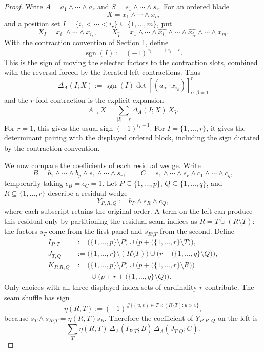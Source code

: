 \documentclass[11pt]{article}
\begin{document}
\begin{proof}
Write \(A=a_1\wedge\cdots\wedge a_r\) and
\(S=s_1\wedge\cdots\wedge s_r\). For an ordered blade
\[
X=x_1\wedge\cdots\wedge x_m
\]
and a position set \(I=\{i_1<\cdots<i_r\}\subseteq\{1,\ldots,m\}\), put
\[
X_I=x_{i_1}\wedge\cdots\wedge x_{i_r},\qquad
X_{\widehat I}=x_1\wedge\cdots\wedge\widehat{x_{i_1}}\wedge\cdots
\wedge\widehat{x_{i_r}}\wedge\cdots\wedge x_m.
\]
With the contraction convention of Section 1, define
\[
\operatorname{sgn}(I):=(-1)^{\,i_1+\cdots+i_r-r}.
\]
This is the sign of moving the selected factors to the contraction slots,
combined with the reversal forced by the iterated left contractions. Thus
\[
\Delta_A(I;X)
:=\operatorname{sgn}(I)
\det\!\left[(a_\alpha\cdot x_{i_\beta})\right]_
             {\alpha,\beta=1}^{r}
\]
and the \(r\)-fold contraction is the explicit expansion
\[
A\mathbin{\lrcorner}X
 =\sum_{\lvert I\rvert=r}\Delta_A(I;X)\,X_{\widehat I}.
\tag{3.1}
\]
For \(r=1\), this gives the usual sign
\((-1)^{i_1-1}\). For \(I=\{1,\ldots,r\}\), it gives the determinant
pairing with the displayed ordered block, including the sign dictated by the
contraction convention.

We now compare the coefficients of each residual wedge. Write
\[
B=b_1\wedge\cdots\wedge b_p\wedge s_1\wedge\cdots\wedge s_r,\qquad
C=s_1\wedge\cdots\wedge s_r\wedge c_1\wedge\cdots\wedge c_q,
\]
temporarily taking \(\epsilon_B=\epsilon_C=1\). Let
\(P\subseteq\{1,\ldots,p\}\), \(Q\subseteq\{1,\ldots,q\}\), and
\(R\subseteq\{1,\ldots,r\}\) describe a residual wedge
\[
Y_{P,R,Q}:=b_P\wedge s_R\wedge c_Q,
\]
where each subscript retains the original order. A term on the left can
produce this residual only by partitioning the residual seam indices as
\(R=T\mathbin{\dot\cup}(R\setminus T)\): the factors \(s_T\) come from the
first panel and \(s_{R\setminus T}\) from the second. Define
\[
\begin{aligned}
I_{P,T}
  &:=\bigl(\{1,\ldots,p\}\setminus P\bigr)
    \cup\bigl(p+\bigl(\{1,\ldots,r\}\setminus T\bigr)\bigr),\\
J_{T,Q}
  &:=\bigl(\{1,\ldots,r\}\setminus(R\setminus T)\bigr)
    \cup\bigl(r+\bigl(\{1,\ldots,q\}\setminus Q\bigr)\bigr),\\
K_{P,R,Q}
  &:=\bigl(\{1,\ldots,p\}\setminus P\bigr)
    \cup\bigl(p+\bigl(\{1,\ldots,r\}\setminus R\bigr)\bigr)\\
  &\qquad\cup\bigl(p+r+\bigl(\{1,\ldots,q\}\setminus Q\bigr)\bigr).
\end{aligned}
\]
Only choices with all three displayed index sets of cardinality \(r\)
contribute. The seam shuffle has sign
\[
\eta(R,T)
:=(-1)^{\#\{(u,v)\in T\times(R\setminus T):u>v\}},
\]
because \(s_T\wedge s_{R\setminus T}=\eta(R,T)s_R\). Therefore the
coefficient of \(Y_{P,R,Q}\) on the left is
\[
\sum_T\eta(R,T)\,
\Delta_A(I_{P,T};B)\,
\Delta_A(J_{T,Q};C).
\tag{3.2}
\]


\end{proof}
\end{document}
